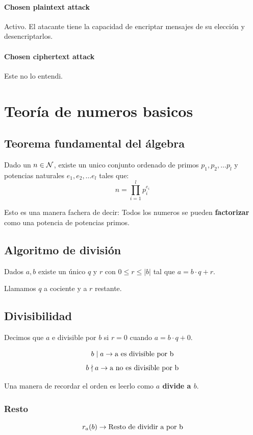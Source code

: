\documentclass[12pt,a4paper]{report}
\begin{document}
\subsubsection{Chosen plaintext attack}
Activo. El atacante tiene la capacidad de encriptar mensajes de su elección y desencriptarlos.
\subsubsection{Chosen ciphertext attack}
Este no lo entendi.

\chapter{Teoría de numeros basicos}
\section{Teorema fundamental del álgebra}
Dado un $n \in \mathcal{{N}}$, existe un unico conjunto ordenado de primos $p_1, p_2, \dots p_l$ y potencias naturales $e_1, e_2, \dots e_l$ tales que:
$$
n = \prod_{i = 1}^{l} p_i^{e_i}
$$

Esto es una manera fachera de decir: Todos los numeros se pueden \textbf{factorizar} como una potencia de potencias primos.

\section{Algoritmo de división}
Dados $a, b$ existe un único $q$ y $r$ con $0 \leq r \leq |b|$ tal que $a = b \cdot q + r$.

Llamamos $q$ a cociente y a $r$ restante.

\section{Divisibilidad}
Decimos que $a$ e divisible por $b$ si $r=0$ cuando $a= b \cdot q + 0$.

$$
b \mid a \rightarrow \text{a es divisible por b}
$$
$$
b \nmid a \rightarrow \text{a no es divisible por b} \\
$$

Una manera de recordar el orden es leerlo como \textbf{$a$ divide a $b$}.

\subsection{Resto}
$$
r_a(b) \rightarrow \text{Resto de dividir a por b}
$$
\end{document}
